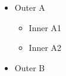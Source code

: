 \begin{itemize}
\item Outer A
  \begin{itemize}
  \item Inner A1
  \item Inner A2
  \end{itemize}
\item Outer B
\end{itemize}
